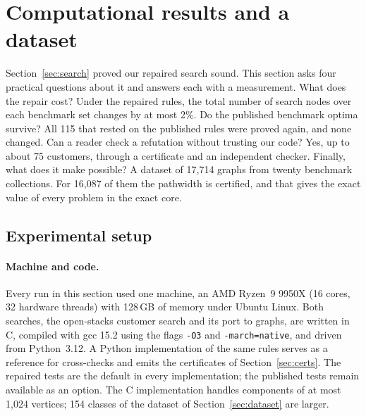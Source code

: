 \section{Computational results and a dataset}
\label{sec:results}

Section~\ref{sec:search} proved our repaired search sound. This section asks
four practical questions about it and answers each with a measurement. What
does the repair cost? Under the repaired rules, the total number of search
nodes over each benchmark set changes by at most 2\%. Do the published
benchmark optima survive? All 115 that rested on the published rules were
proved again, and none changed. Can a reader check a refutation without
trusting our code? Yes, up to about 75 customers, through a certificate and an
independent checker. Finally, what does it make possible? A dataset of 17,714
graphs from twenty benchmark collections. For 16,087 of them the pathwidth is
certified, and that gives the exact value of every problem in the exact core.

\subsection{Experimental setup}
\label{sec:setup}

\paragraph{Machine and code.} Every run in this section used one
machine, an AMD Ryzen~9 9950X (16 cores, 32 hardware threads) with 128\,GB of
memory under Ubuntu Linux. Both searches, the open-stacks customer search and
its port to graphs, are written in C, compiled with gcc 15.2 using the
flags \texttt{-O3} and \texttt{-march=native}, and driven from Python~3.12. A Python implementation of the
same rules serves as a reference for cross-checks and emits the certificates
of Section~\ref{sec:certs}. The repaired tests are the default in every
implementation; the published tests remain available as an option. The C
implementation handles components of at most 1,024 vertices; 154 classes of
the dataset of Section~\ref{sec:dataset} are larger.

